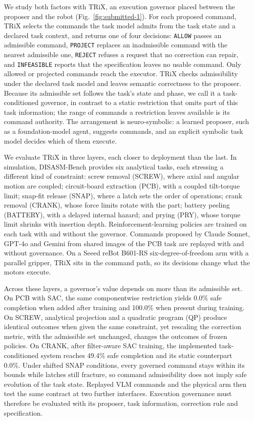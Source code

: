 \documentclass[12pt]{article}
\begin{document}
We study both factors with TRiX, an execution governor placed between the
proposer and the robot (Fig.~\ref{fig:submitted-1}). For each proposed
command, TRiX selects the commands the task model admits from the task state
and a declared task context, and returns one of four decisions:
\texttt{ALLOW} passes an admissible command, \texttt{PROJECT} replaces an
inadmissible command with the nearest admissible one, \texttt{REJECT} refuses
a request that no correction can repair, and \texttt{INFEASIBLE} reports that
the specification leaves no usable command. Only allowed or projected commands
reach the executor. TRiX checks admissibility under the declared task model
and leaves semantic correctness to the proposer. Because its admissible set follows the task's state and phase, we
call it a task-conditioned governor, in contrast to a static restriction that
omits part of this task information; the range of commands a restriction
leaves available is its command authority. The arrangement is neuro-symbolic: a learned proposer, such as a foundation-model agent, suggests commands, and an explicit symbolic task model decides which of them execute.

We evaluate TRiX in three layers, each closer to deployment than the last. In
simulation, DISASM-Bench provides six analytical tasks, each stressing a
different kind of constraint: screw removal (SCREW), where axial and angular
motion are coupled; circuit-board extraction (PCB), with a coupled tilt-torque
limit; snap-fit release (SNAP), where a latch sets the order of operations;
crank removal (CRANK), whose force limits rotate with the part; battery
peeling (BATTERY), with a delayed internal hazard; and prying (PRY), whose
torque limit shrinks with insertion depth. Reinforcement-learning policies are
trained on each task with and without the governor. Commands proposed by
Claude Sonnet, GPT-4o and Gemini from shared images of the PCB task are
replayed with and without governance. On a Seeed reBot B601-RS
six-degree-of-freedom arm with a parallel gripper, TRiX sits in the command
path, so its decisions change what the motors execute.

Across these layers, a governor's value depends on more than its admissible
set. On PCB with SAC, the same componentwise restriction yields 0.0\% safe completion when added after training and 100.0\% when present during training. On SCREW, analytical projection and a quadratic program (QP) produce identical outcomes
when given the same constraint, yet rescaling the correction metric, with the admissible set unchanged, changes
the outcomes of frozen policies. On CRANK, after filter-aware SAC training, the implemented task-conditioned system reaches 49.4\% safe completion and its static counterpart 0.0\%. Under shifted
SNAP conditions, every governed command stays within its bounds while latches
still fracture, so command admissibility does not imply safe evolution of the
task state. Replayed VLM commands and the physical arm then test the same
contract at two further interfaces. Execution governance must therefore be evaluated with its proposer, task information, correction rule and specification.
\end{document}
